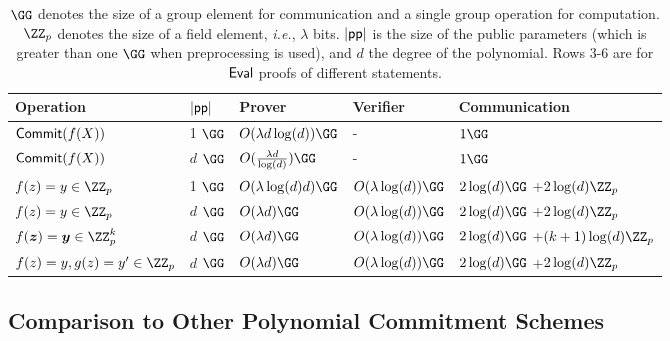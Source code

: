 \begin{table}[!htp]
\begin{small}
\begin{tabular}{l|l||l|l|l}
	Operation & $|\textsf{pp}|$  & Prover & Verifier & Communication\\
	\hline
    $\textsf{{Commit}}(f(X))$ & 1 $\GG$ & $O(\lambda d\log(d))\GG$ & - & $1 \GG$\\
    $\textsf{{Commit}}(f(X))$ & $d$ $\GG$ & $O(\frac{\lambda d}{\log(d)}) \GG$ & - & $1 \GG$\\
    $f(z)=y\in \ZZ_p$  & 1 $\GG$ & $O(\lambda  \log(d) d)\GG$ & $O(\lambda \log(d))\GG$ & $2 \log(d) \GG$ +$2 \log(d) \ZZ_p$ \\
      $f(z)=y\in \ZZ_p$  & $d$ $\GG$ & $O(\lambda d)\GG$ & $O(\lambda \log(d))\GG$ & $2 \log(d) \GG$ +$2 \log(d) \ZZ_p$ \\
       $f(\boldsymbol{z})=\boldsymbol{y}\in \ZZ^k_p$  & $d$ $\GG$ & $O(\lambda d)\GG$ & $O(\lambda \log(d))\GG$ & $2 \log(d) \GG$ +$(k+1) \log(d) \ZZ_p$ \\
                $f(z)=y, g(z)=y'\in \ZZ_p$  & $d$ $\GG$ & $O(\lambda d)\GG$ & $O(\lambda \log(d))\GG$ & $2 \log(d) \GG$ +$2 \log(d) \ZZ_p$ \\

\end{tabular}

\caption{$\GG$ denotes the size of a group element for communication and a single group operation for computation. $\ZZ_p$ denotes the size of a field element, \emph{i.e.}, $\lambda$ bits. $|\textsf{pp}|$ is the size of the public parameters (which is greater than one $\GG$ when preprocessing is used), and $d$ the degree of the polynomial. Rows 3-6 are for $\textsf{{Eval}}$ proofs of different statements.}
\label{tab:performance}
\end{small}
\end{table}


\subsection{Comparison to Other Polynomial Commitment Schemes}

